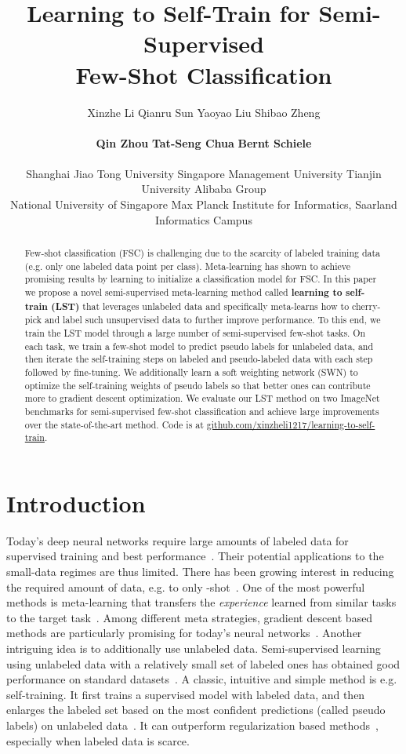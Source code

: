 \documentclass{article}
\title{Learning to Self-Train for Semi-Supervised\\ Few-Shot Classification}
\author{Xinzhe Li \quad Qianru Sun
\quad Yaoyao Liu \quad Shibao Zheng \\ \\
\textbf{Qin Zhou}
\quad
\textbf{Tat-Seng Chua} \quad \textbf{Bernt Schiele}\\
\\
\small Shanghai Jiao Tong University
 Singapore Management University
 Tianjin University Alibaba Group \\
 \small
 National University of Singapore
 Max Planck Institute for Informatics, Saarland Informatics Campus
}
\begin{document}
\maketitle

\begin{abstract}

Few-shot classification (FSC) is challenging due to the scarcity of labeled training data (e.g. only one labeled data point per class). Meta-learning has shown to achieve promising results by learning to initialize a classification model for FSC. In this paper we propose a novel semi-supervised meta-learning method called \textbf{learning to self-train (LST)} 
that leverages unlabeled data and specifically meta-learns how to cherry-pick and label such unsupervised data to further improve performance. To this end, we train the LST model through a large number of semi-supervised few-shot tasks. On each task, we train a few-shot model to predict pseudo labels for unlabeled data, and then iterate the self-training steps on labeled and pseudo-labeled data with each step followed by fine-tuning. We additionally learn a soft weighting network (SWN) to optimize the self-training weights of pseudo labels so that better ones can contribute more to gradient descent optimization. We evaluate our LST method on two ImageNet benchmarks for semi-supervised few-shot classification and achieve large improvements over the state-of-the-art method. Code is at \href{https://github.com/xinzheli1217/learning-to-self-train}{github.com/xinzheli1217/learning-to-self-train}.

\end{abstract}
 \section{Introduction}
\label{introduction}

Today's deep neural networks require large amounts of labeled data for supervised training and best performance~\cite{Lecun2015, HeZRS16, ShelhamerLD17}. 
Their potential applications to the small-data regimes are thus limited.
There has been growing interest in reducing the required amount of data, e.g. to only -shot~\cite{FeiFeiFP06}.
One of the most powerful methods is meta-learning that transfers the \emph{experience} learned from similar tasks to the target task~\cite{FinnAL17}. 
Among different meta strategies, gradient descent based methods are particularly promising for today's neural networks~\cite{FinnAL17, SunCVPR2019, RusuICLR2019}.
Another intriguing idea is to additionally use unlabeled data.
Semi-supervised learning using unlabeled data with a relatively small set of labeled ones has obtained good performance on standard datasets~\cite{Chapelle2006semi_supervise, OliverNIPS18semi_survey}.
A classic, intuitive and simple method is e.g. self-training. It first trains a supervised model with labeled data, and then enlarges the labeled set based on the most confident predictions (called pseudo labels) on unlabeled data~\cite{Yarowsky95self_training, TrigueroGH15self_labeled, OliverNIPS18semi_survey}.
It can outperform regularization based methods~\cite{MiyatoDG16VAT, GrandvaletNIPS04_entmin, LaineICLR2017pi_model}, especially when labeled data is scarce.
\end{document}
